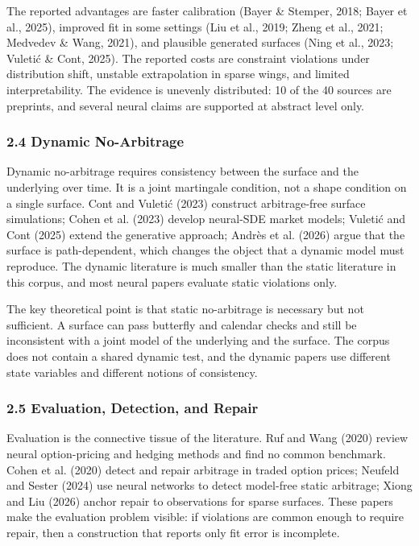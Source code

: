 \documentclass[11pt]{article}
\begin{document}
The reported advantages are faster calibration (Bayer \& Stemper, 2018; Bayer et al., 2025), improved fit in some settings (Liu et al., 2019; Zheng et al., 2021; Medvedev \& Wang, 2021), and plausible generated surfaces (Ning et al., 2023; Vuletić \& Cont, 2025). The reported costs are constraint violations under distribution shift, unstable extrapolation in sparse wings, and limited interpretability. The evidence is unevenly distributed: 10 of the 40 sources are preprints, and several neural claims are supported at abstract level only.

\subsubsection*{2.4 Dynamic No-Arbitrage}
Dynamic no-arbitrage requires consistency between the surface and the underlying over time. It is a joint martingale condition, not a shape condition on a single surface. Cont and Vuletić (2023) construct arbitrage-free surface simulations; Cohen et al. (2023) develop neural-SDE market models; Vuletić and Cont (2025) extend the generative approach; Andrès et al. (2026) argue that the surface is path-dependent, which changes the object that a dynamic model must reproduce. The dynamic literature is much smaller than the static literature in this corpus, and most neural papers evaluate static violations only.

The key theoretical point is that static no-arbitrage is necessary but not sufficient. A surface can pass butterfly and calendar checks and still be inconsistent with a joint model of the underlying and the surface. The corpus does not contain a shared dynamic test, and the dynamic papers use different state variables and different notions of consistency.

\subsubsection*{2.5 Evaluation, Detection, and Repair}
Evaluation is the connective tissue of the literature. Ruf and Wang (2020) review neural option-pricing and hedging methods and find no common benchmark. Cohen et al. (2020) detect and repair arbitrage in traded option prices; Neufeld and Sester (2024) use neural networks to detect model-free static arbitrage; Xiong and Liu (2026) anchor repair to observations for sparse surfaces. These papers make the evaluation problem visible: if violations are common enough to require repair, then a construction that reports only fit error is incomplete.
\end{document}
